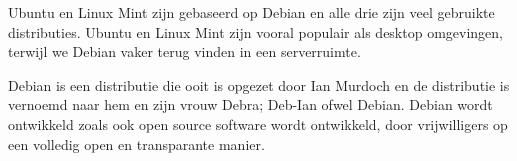 Ubuntu en Linux Mint zijn gebaseerd op Debian en alle drie zijn veel gebruikte distributies. Ubuntu en Linux Mint zijn
vooral populair als desktop omgevingen, terwijl we Debian vaker terug vinden in een serverruimte.

{
Debian is een distributie die ooit is opgezet door Ian Murdoch en de distributie is vernoemd naar hem en zijn vrouw
Debra; Deb-Ian ofwel Debian. Debian wordt ontwikkeld zoals ook open source software wordt ontwikkeld, door
vrijwilligers op een volledig open en transparante manier.}

